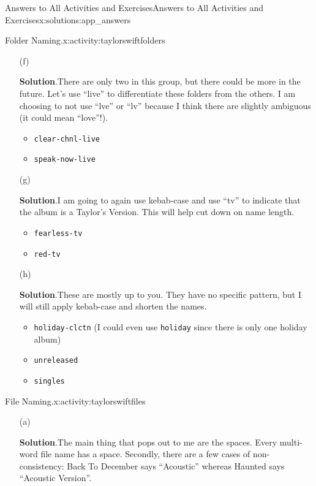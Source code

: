 \documentclass[oneside,10pt,]{book}
\newcommand{\blocktitlefont}{\relax}
\newcommand{\mono}[1]{\texttt{#1}}
\begin{document}
\begin{solutions-chapter}{Answers to All Activities and Exercises}{}{Answers to All Activities and Exercises}{}{}{x:solutions:app_answers}
\begin{activitysolution}{1.1}{Folder Naming.}{x:activity:taylorswiftfolders}
\begin{enumerate}[font=\bfseries,label=(\alph*),ref=\alph*]
\begin{multicols}{2}
\end{multicols}
%
\item[(f)]\par\smallskip%
\noindent\textbf{\blocktitlefont Solution}.\hypertarget{g:solution:idp615135144-back}{}\quad{}There are only two in this group, but there could be more in the future. Let's use ``live'' to differentiate these folders from the others. I am choosing to not use ``lve'' or ``lv'' because I think there are slightly ambiguous (it could mean ``love''!).%
\begin{itemize}[label=\textbullet]
\item{}\mono{clear-chnl-live}%
\item{}\mono{speak-now-live}%
\end{itemize}
%
\item[(g)]\par\smallskip%
\noindent\textbf{\blocktitlefont Solution}.\hypertarget{g:solution:idp615148968-back}{}\quad{}I am going to again use kebab-case and use ``tv'' to indicate that the album is a Taylor's Version. This will help cut down on name length.%
\begin{itemize}[label=\textbullet]
\item{}\mono{fearless-tv}%
\item{}\mono{red-tv}%
\end{itemize}
%
\item[(h)]\par\smallskip%
\noindent\textbf{\blocktitlefont Solution}.\hypertarget{g:solution:idp615145768-back}{}\quad{}These are mostly up to you. They have no specific pattern, but I will still apply kebab-case and shorten the names.%
\begin{itemize}[label=\textbullet]
\item{}\mono{holiday-clctn} (I could even use \mono{holiday} since there is only one holiday album)%
\item{}\mono{unreleased}%
\item{}\mono{singles}%
\end{itemize}
%
\end{enumerate}
\end{activitysolution}%
\begin{activitysolution}{1.2}{File Naming.}{x:activity:taylorswiftfiles}%
\begin{enumerate}[font=\bfseries,label=(\alph*),ref=\alph*]
\item[(a)]\par\smallskip%
\noindent\textbf{\blocktitlefont Solution}.\hypertarget{g:solution:idp615170216-back}{}\quad{}The main thing that pops out to me are the spaces. Every multi-word file name has a space. Secondly, there are a few cases of non-consistency: Back To December says ``Acoustic'' whereas Haunted says ``Acoustic Version''.%

\end{enumerate}
\end{activitysolution}
\end{solutions-chapter}
\end{document}
